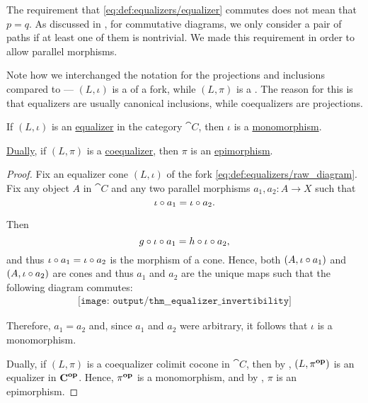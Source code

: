\begin{definition}
  The requirement that \eqref{eq:def:equalizers/equalizer} commutes does not mean that \( p = q \). As discussed in , for commutative diagrams, we only consider a pair of paths if at least one of them is nontrivial. We made this requirement in order to allow parallel morphisms.

  Note how we interchanged the notation for the projections and inclusions compared to  --- \( (L, \iota) \) is a  of a fork, while \( (L, \pi) \) is a . The reason for this is that equalizers are usually canonical inclusions, while coequalizers are projections.
\end{definition}

\begin{proposition}\label{thm:equalizer_invertibility}
  If \( (L, \iota) \) is an \hyperref[def:equalizers]{equalizer} in the category \( \cat{C} \), then \( \iota \) is a \hyperref[def:morphism_invertibility/left_cancellative]{monomorphism}.

  \hyperref[thm:categorical_principle_of_duality]{Dually}, if \( (L, \pi) \) is a \hyperref[def:equalizers]{coequalizer}, then \( \pi \) is an \hyperref[def:morphism_invertibility/right_cancellative]{epimorphism}.
\end{proposition}
\begin{proof}
  Fix an equalizer cone \( (L, \iota) \) of the fork \eqref{eq:def:equalizers/raw_diagram}. Fix any object \( A \) in \( \cat{C} \) and any two parallel morphisms \( a_1, a_2: A \to X \) such that
  \begin{equation*}
    \iota \bincirc a_1 = \iota \bincirc a_2.
  \end{equation*}

  Then
  \begin{equation*}
    g \bincirc \iota \bincirc a_1 = h \bincirc \iota \bincirc a_2,
  \end{equation*}
  and thus \( \iota \bincirc a_1 = \iota \bincirc a_2 \) is the morphism of a cone. Hence, both \( (A, \iota \bincirc a_1) \) and \( (A, \iota \bincirc a_2) \) are cones and thus \( a_1 \) and \( a_2 \) are the unique maps such that the following diagram commutes:
  \begin{equation}\label{eq:thm:equalizer_invertibility/monomorphism}
    \begin{aligned}
      \texttt{[image: output/thm\_\_equalizer\_invertibility]}
    \end{aligned}
  \end{equation}

  Therefore, \( a_1 = a_2 \) and, since \( a_1 \) and \( a_2 \) were arbitrary, it follows that \( \iota \) is a monomorphism.

  Dually, if \( (L, \pi) \) is a coequalizer colimit cocone in \( \cat{C} \), then by , \( (L, \pi^\oppos) \) is an equalizer in \( \cat{C}^\oppos \). Hence, \( \pi^\oppos \) is a monomorphism, and by , \( \pi \) is an epimorphism.
\end{proof}

